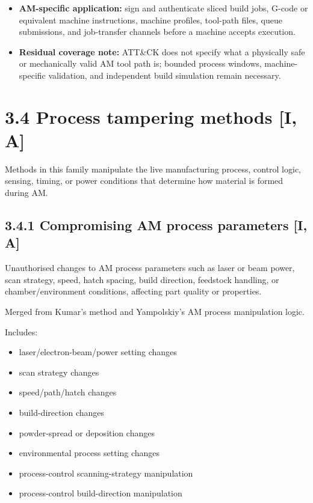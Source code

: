 \documentclass[10pt,a4paper,oneside]{report}
\begin{document}
\begin{itemize}
\item \textbf{AM-specific application:} sign and authenticate sliced build jobs, G-code or equivalent machine instructions, machine profiles, tool-path files, queue submissions, and job-transfer channels before a machine accepts execution.
\end{itemize}

\begin{itemize}
\item \textbf{Residual coverage note:} ATT\&CK does not specify what a physically safe or mechanically valid AM tool path is; bounded process windows, machine-specific validation, and independent build simulation remain necessary.
\end{itemize}


\section{3.4 Process tampering methods [I, A]}


Methods in this family manipulate the live manufacturing process, control logic, sensing, timing, or power conditions that determine how material is formed during AM.


\subsection{3.4.1 Compromising AM process parameters [I, A]}


Unauthorised changes to AM process parameters such as laser or beam power, scan strategy, speed, hatch spacing, build direction, feedstock handling, or chamber/environment conditions, affecting part quality or properties.

Merged from Kumar's method and Yampolskiy's AM process manipulation logic.

Includes:

\begin{itemize}
\item laser/electron-beam/power setting changes
\item scan strategy changes
\item speed/path/hatch changes
\item build-direction changes
\item powder-spread or deposition changes
\item environmental process setting changes
\item process-control scanning-strategy manipulation
\item process-control build-direction manipulation
\end{itemize}
\end{document}
